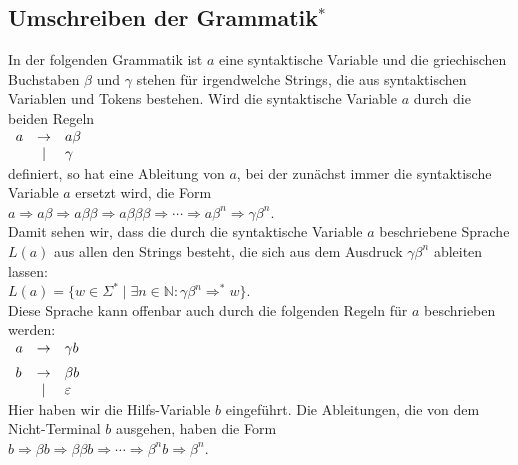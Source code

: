 \subsection{Umschreiben der Grammatik$^*$ \label{links-rekursion}}
In der folgenden Grammatik ist $a$ eine syntaktische Variable und die griechischen Buchstaben $\beta$ und
$\gamma$ stehen f\"ur irgendwelche Strings, die aus syntaktischen Variablen und Tokens bestehen.
Wird die syntaktische Variable $a$ durch die beiden Regeln
\\[0.2cm]
\hspace*{1.3cm}
$
\begin{array}[t]{lcl}
a & \rightarrow & a \beta \\
  & \mid        & \gamma
\end{array}
$
\\[0.2cm]
definiert, so hat eine Ableitung von $a$, bei der zun\"achst immer die syntaktische Variable $a$ ersetzt
wird, die Form 
\\[0.2cm]
\hspace*{1.3cm}
$a \Rightarrow a \beta \Rightarrow a \beta \beta \Rightarrow a \beta \beta \beta
 \Rightarrow \cdots \Rightarrow a \beta^n \Rightarrow \gamma \beta^n$.
\\[0.2cm]
Damit sehen wir, dass die durch die syntaktische Variable $a$ beschriebene Sprache $L(a)$ aus allen den
Strings besteht, die sich aus dem Ausdruck $\gamma \beta^n$ ableiten lassen:
\\[0.2cm]
\hspace*{1.3cm}
$L(a) = \bigl\{ w \in \Sigma^* \mid \exists n \in \mathbb{N}: \gamma \beta^n \Rightarrow^* w \bigr\}$.
\\[0.2cm]
Diese Sprache kann offenbar auch durch die folgenden Regeln f\"ur $a$ beschrieben werden:
\\[0.2cm]
\hspace*{1.3cm}
$
\begin{array}[t]{lcl}
a & \rightarrow & \gamma b \\[0.2cm]
b & \rightarrow & \beta b  \\
  & \mid        & \varepsilon 
\end{array}
$
\\[0.2cm]
Hier haben wir die Hilfs-Variable $b$ eingef\"uhrt.  Die Ableitungen, die von dem Nicht-Terminal $b$
ausgehen, haben die Form
\\[0.2cm]
\hspace*{1.3cm} $b \Rightarrow \beta b \Rightarrow \beta \beta b \Rightarrow \cdots \Rightarrow
\beta^n b \Rightarrow \beta^n$.
